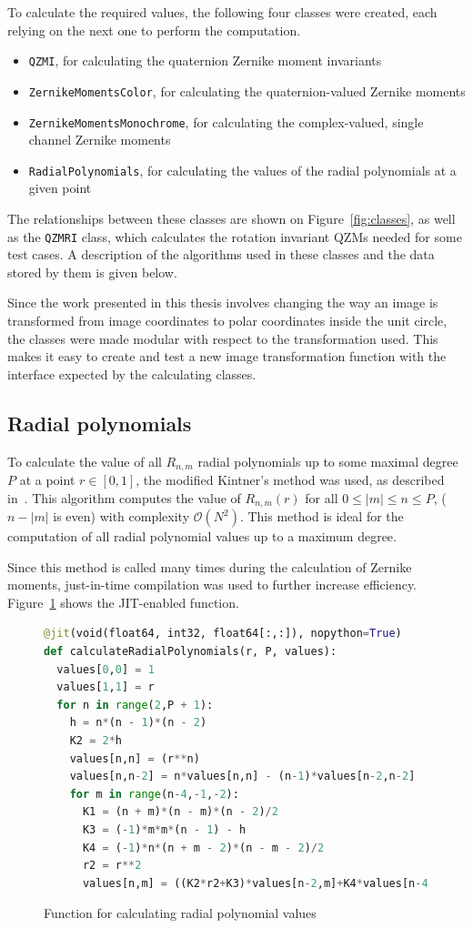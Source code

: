 To calculate the required values, the following four classes were created, each relying on the next one to perform the computation.
\begin{itemize}
    \item \texttt{QZMI}, for calculating the quaternion Zernike moment invariants
    \item \texttt{ZernikeMomentsColor}, for calculating the quaternion-valued Zernike moments
    \item \texttt{ZernikeMomentsMonochrome}, for calculating the complex-valued, single channel Zernike moments
    \item \texttt{RadialPolynomials}, for calculating the values of the radial polynomials at a given point
\end{itemize}
The relationships between these classes are shown on Figure~\ref{fig:classes}, as well as the \texttt{QZMRI} class, which calculates the rotation invariant QZMs needed for some test cases. A description of the algorithms used in these classes and the data stored by them is given below.

Since the work presented in this thesis involves changing the way an image is transformed from image coordinates to polar coordinates inside the unit circle, the classes were made modular with respect to the transformation used. This makes it easy to create and test a new image transformation function with the interface expected by the calculating classes.

\subsection{Radial polynomials}
To calculate the value of all $R_{n,m}$ radial polynomials up to some maximal degree $P$ at a point $r \in [0,1]$, the modified Kintner's method was used, as described in~\cite{kintner}. This algorithm computes the value of $R_{n,m}(r)$ for all $0 \leq |m| \leq n \leq P$, ($n - |m|$ is even) with complexity $\mathcal{O}(N^2)$. This method is ideal for the computation of all radial polynomial values up to a maximum degree.

Since this method is called many times during the calculation of Zernike moments, just-in-time compilation was used to further increase efficiency. Figure~\ref{fig:radial_code} shows the JIT-enabled function.

\begin{figure}[tbp]
    \centering
    \begin{lstlisting}[language=Python]
@jit(void(float64, int32, float64[:,:]), nopython=True)
def calculateRadialPolynomials(r, P, values):
  values[0,0] = 1
  values[1,1] = r
  for n in range(2,P + 1):
    h = n*(n - 1)*(n - 2)
    K2 = 2*h
    values[n,n] = (r**n)
    values[n,n-2] = n*values[n,n] - (n-1)*values[n-2,n-2]
    for m in range(n-4,-1,-2):			
      K1 = (n + m)*(n - m)*(n - 2)/2
      K3 = (-1)*m*m*(n - 1) - h
      K4 = (-1)*n*(n + m - 2)*(n - m - 2)/2
      r2 = r**2
      values[n,m] = ((K2*r2+K3)*values[n-2,m]+K4*values[n-4,m])/K1\end{lstlisting}
    \caption{Function for calculating radial polynomial values}
    \label{fig:radial_code}
\end{figure}

